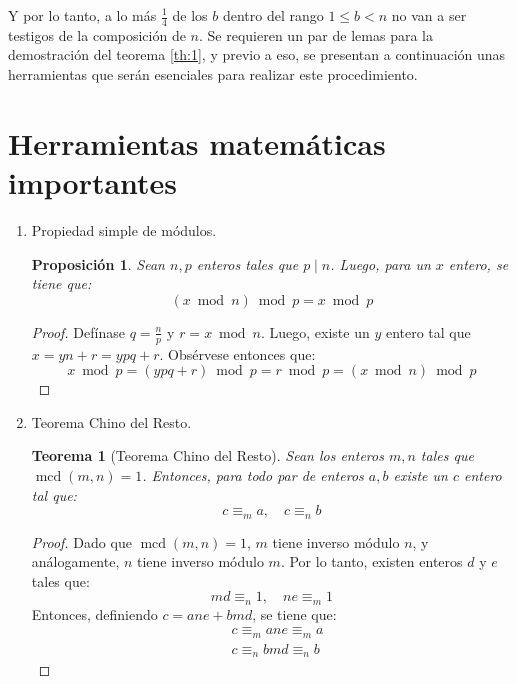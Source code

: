 \documentclass[hidelinks, 12pt]{article}
\DeclareMathOperator{\mcd}{mcd}
\newtheorem{theorem}{Teorema}
\newtheorem*{proposition}{Proposición}
\begin{document}
Y por lo tanto, a lo más $\frac{1}{4}$ de los $b$ dentro del rango $1\leq b<n$ no van a ser testigos de la composición de $n$. Se requieren un par de lemas para la demostración del teorema \ref{th:1}, y previo a eso, se presentan a continuación unas herramientas que serán esenciales para realizar este procedimiento.

\newpage
\section{Herramientas matemáticas importantes}
\begin{enumerate}
    \item Propiedad simple de módulos. \\
    \begin{proposition}
        Sean $n,p$ enteros tales que $p\mid n$. Luego, para un $x$ entero, se tiene que: \[(x\bmod n)\bmod p=x\bmod p\]
    \end{proposition}
    \begin{proof}
        Defínase $q=\frac{n}{p}$ y $r=x\bmod n$. Luego, existe un $y$ entero tal que $x=yn+r=ypq+r$. Obsérvese entonces que:
        \[x\bmod p=(ypq+r)\bmod p=r\bmod p=(x\bmod n)\bmod p\]
    \end{proof}
    
    \item Teorema Chino del Resto. \\
    \begin{theorem}[Teorema Chino del Resto]
        Sean los enteros $m,n$ tales que $\mcd(m,n)=1$. Entonces, para todo par de enteros $a,b$ existe un $c$ entero tal que: 
        \[c\equiv_m a,\quad c\equiv_n b\]
    \end{theorem}
    \begin{proof}
        Dado que $\mcd(m,n)=1$, $m$ tiene inverso módulo $n$, y análogamente, $n$ tiene inverso módulo $m$. Por lo tanto, existen enteros $d$ y $e$ tales que:
        \[md\equiv_n 1,\quad ne\equiv_m 1\]
        Entonces, definiendo $c=ane+bmd$, se tiene que:
        \begin{align*}
            &c\equiv_m ane\equiv_m a\\
            &c\equiv_n bmd\equiv_n b
        \end{align*}
    \end{proof}
    

\end{enumerate}
\end{document}
